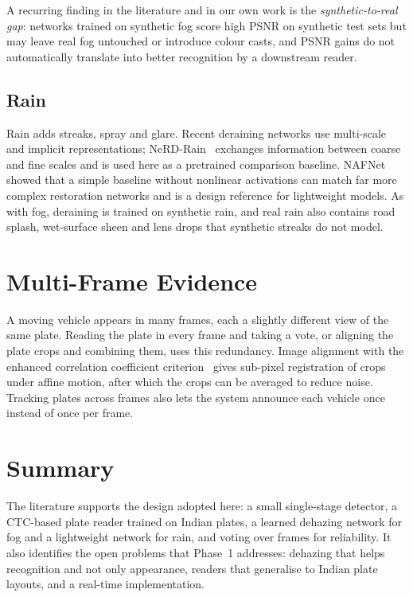 A recurring finding in the literature and in our own work is the
\emph{synthetic-to-real gap}: networks trained on synthetic fog score high
PSNR on synthetic test sets but may leave real fog untouched or introduce
colour casts, and PSNR gains do not automatically translate into better
recognition by a downstream reader.

\subsection{Rain}

Rain adds streaks, spray and glare. Recent deraining networks use multi-scale
and implicit representations; NeRD-Rain~\cite{chen2024nerdrain}
exchanges information between coarse and fine scales and is used here as a
pretrained comparison baseline. NAFNet~\cite{chen2022nafnet} showed that a
simple baseline without nonlinear activations can match far more complex
restoration networks and is a design reference for lightweight models. As with
fog, deraining is trained on synthetic rain, and real rain also contains road
splash, wet-surface sheen and lens drops that synthetic streaks do not model.

\section{Multi-Frame Evidence}

A moving vehicle appears in many frames, each a slightly different view of the
same plate. Reading the plate in every frame and taking a vote, or aligning
the plate crops and combining them, uses this redundancy. Image alignment with
the enhanced correlation coefficient criterion~\cite{evangelidis2008ecc} gives
sub-pixel registration of crops under affine motion, after which the crops can
be averaged to reduce noise. Tracking plates across frames also lets the system
announce each vehicle once instead of once per frame.

\section{Summary}

The literature supports the design adopted here: a small single-stage detector,
a CTC-based plate reader trained on Indian plates, a learned dehazing network
for fog and a lightweight network for rain, and voting over frames for
reliability. It also identifies the open problems that Phase~1 addresses:
dehazing that helps recognition and not only appearance, readers that
generalise to Indian plate layouts, and a real-time implementation.
